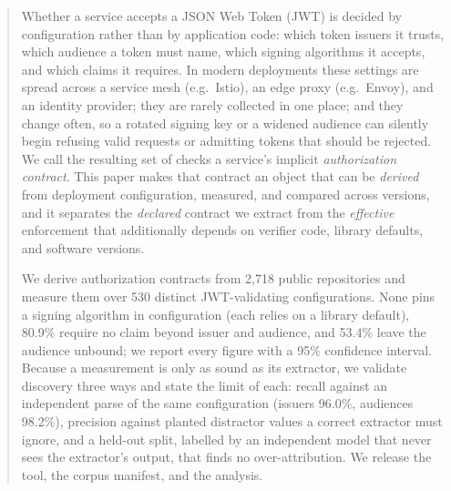 \begin{abstract}
Whether a service accepts a JSON Web Token (JWT) is decided by configuration rather
than by application code: which token issuers it trusts, which audience a token must
name, which signing algorithms it accepts, and which claims it requires. In modern
deployments these settings are spread across a service mesh (e.g.\ Istio), an edge
proxy (e.g.\ Envoy), and an identity provider; they are rarely collected in one
place; and they change often, so a rotated signing key or a widened audience can
silently begin refusing valid requests or admitting tokens that should be rejected.
We call the resulting set of checks a service's implicit \emph{authorization
contract}. This paper makes that contract an object that can be \emph{derived} from
deployment configuration, measured, and compared across versions, and it separates
the \emph{declared} contract we extract from the \emph{effective} enforcement that
additionally depends on verifier code, library defaults, and software versions.

We derive authorization contracts from 2{,}718 public repositories and measure them
over 530 distinct JWT-validating configurations. None pins a signing algorithm in
configuration (each relies on a library default), 80.9\% require no claim beyond
issuer and audience, and 53.4\% leave the audience unbound; we report every figure
with a 95\% confidence interval. Because a measurement is only as sound as its
extractor, we validate discovery three ways and state the limit of each: recall
against an independent parse of the same configuration (issuers 96.0\%, audiences
98.2\%), precision against planted distractor values a correct extractor must
ignore, and a held-out split, labelled by an independent model that never sees the
extractor's output, that finds no over-attribution. We release the tool, the corpus
manifest, and the analysis.
\end{abstract}
